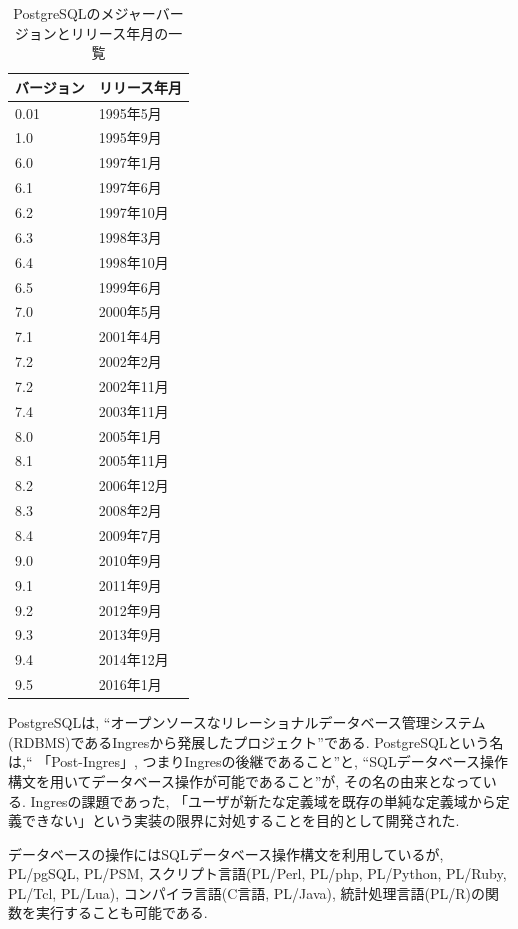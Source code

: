 \begin{table}[htb]
\begin{center}
\begin{tabular}{|l|l|} \hline
バージョン & リリース年月 \\ \hline \hline
0.01 & 1995年5月 \\ \hline
1.0 & 1995年9月 \\ \hline
6.0 & 1997年1月 \\ \hline
6.1 & 1997年6月 \\ \hline
6.2 & 1997年10月 \\ \hline
6.3 & 1998年3月 \\ \hline
6.4 & 1998年10月 \\ \hline
6.5 & 1999年6月 \\ \hline
7.0 & 2000年5月 \\ \hline
7.1 & 2001年4月 \\ \hline
7.2 & 2002年2月 \\ \hline
7.2 & 2002年11月 \\ \hline
7.4 & 2003年11月 \\ \hline
8.0 & 2005年1月 \\ \hline
8.1 & 2005年11月 \\ \hline
8.2 & 2006年12月 \\ \hline
8.3 & 2008年2月 \\ \hline
8.4 & 2009年7月 \\ \hline
9.0 & 2010年9月 \\ \hline
9.1 & 2011年9月 \\ \hline
9.2 & 2012年9月 \\ \hline
9.3 & 2013年9月 \\ \hline
9.4 & 2014年12月 \\ \hline
9.5 & 2016年1月 \\ \hline
\end{tabular}
\caption{PostgreSQLのメジャーバージョンとリリース年月の一覧}
\end{center}
\end{table}

PostgreSQLは, “オープンソースなリレーショナルデータベース管理システム(RDBMS)であるIngresから発展したプロジェクト”である.
PostgreSQLという名は,“ 「Post-Ingres」, つまりIngresの後継であること”と, “SQLデータベース操作構文を用いてデータベース操作が可能であること”が, その名の由来となっている.
Ingresの課題であった, 「ユーザが新たな定義域を既存の単純な定義域から定義できない」という実装の限界に対処することを目的として開発された.

データベースの操作にはSQLデータベース操作構文を利用しているが, PL/pgSQL, PL/PSM, スクリプト言語(PL/Perl, PL/php, PL/Python, PL/Ruby, PL/Tcl, PL/Lua), コンパイラ言語(C言語, PL/Java), 統計処理言語(PL/R)の関数を実行することも可能である.

